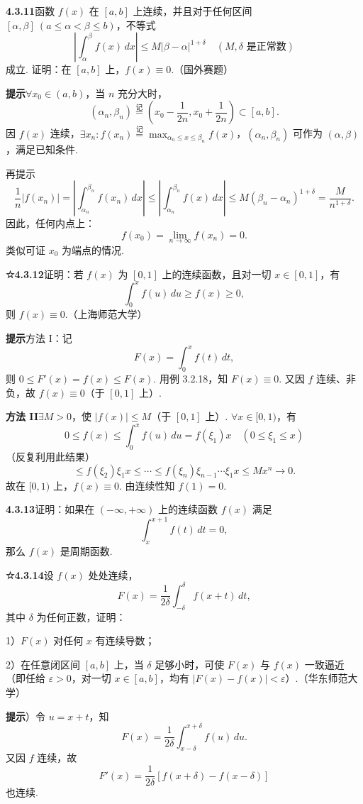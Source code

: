 \documentclass[UTF8,12pt,a4paper,fontset=fandol]{ctexart}
\begin{document}
\noindent\textbf{4.3.11}\quad 函数 $f(x)$ 在 $[a,b]$ 上连续，并且对于任何区间 $[\alpha,\beta]\ (a\le\alpha<\beta\le b)$，不等式
\[
\left|\int_\alpha^\beta f(x)\,dx\right|
\le M|\beta-\alpha|^{1+\delta}\quad(M,\delta\text{ 是正常数})
\]
成立. 证明：在 $[a,b]$ 上，$f(x)\equiv0$.（国外赛题）

\noindent\textbf{提示}\quad $\forall x_0\in(a,b)$，当 $n$ 充分大时，
\[
(\alpha_n,\beta_n)\stackrel{\text{记}}{=}\left(x_0-\frac1{2n},x_0+\frac1{2n}\right)\subset[a,b].
\]
因 $f(x)$ 连续，$\exists x_n:f(x_n)\stackrel{\text{记}}{=}\max_{\alpha_n\le x\le\beta_n}f(x)$，$(\alpha_n,\beta_n)$ 可作为 $(\alpha,\beta)$，满足已知条件.

再提示
\[
\frac1n|f(x_n)|
=\left|\int_{\alpha_n}^{\beta_n}f(x_n)\,dx\right|
\le\left|\int_{\alpha_n}^{\beta_n}f(x)\,dx\right|
\le M(\beta_n-\alpha_n)^{1+\delta}=\frac{M}{n^{1+\delta}}.
\]
因此，任何内点上：
\[
f(x_0)=\lim_{n\to\infty}f(x_n)=0.
\]
类似可证 $x_0$ 为端点的情况.

\noindent\textbf{☆4.3.12}\quad 证明：若 $f(x)$ 为 $[0,1]$ 上的连续函数，且对一切 $x\in[0,1]$，有
\[
\int_0^x f(u)\,du\ge f(x)\ge0,
\]
则 $f(x)\equiv0$.（上海师范大学）

\noindent\textbf{提示}\quad 方法 I：记
\[
F(x)=\int_0^x f(t)\,dt,
\]
则 $0\le F'(x)=f(x)\le F(x)$. 用例 3.2.18，知 $F(x)\equiv0$. 又因 $f$ 连续、非负，故 $f(x)\equiv0$（于 $[0,1]$ 上）.

\noindent\textbf{方法 II}\quad $\exists M>0$，使 $|f(x)|\le M$（于 $[0,1]$ 上）. $\forall x\in[0,1)$，有
\[
0\le f(x)\le\int_0^x f(u)\,du=f(\xi_1)x\quad(0\le\xi_1\le x)
\]
（反复利用此结果）
\[
\le f(\xi_2)\xi_1x\le\cdots\le f(\xi_n)\xi_{n-1}\cdots\xi_1x\le Mx^n\to0.
\]
故在 $[0,1)$ 上，$f(x)\equiv0$. 由连续性知 $f(1)=0$.

\noindent\textbf{4.3.13}\quad 证明：如果在 $(-\infty,+\infty)$ 上的连续函数 $f(x)$ 满足
\[
\int_x^{x+1}f(t)\,dt=0,
\]
那么 $f(x)$ 是周期函数.

\noindent\textbf{☆4.3.14}\quad 设 $f(x)$ 处处连续，
\[
F(x)=\frac1{2\delta}\int_{-\delta}^{\delta}f(x+t)\,dt,
\]
其中 $\delta$ 为任何正数，证明：

1）$F(x)$ 对任何 $x$ 有连续导数；

2）在任意闭区间 $[a,b]$ 上，当 $\delta$ 足够小时，可使 $F(x)$ 与 $f(x)$ 一致逼近（即任给 $\varepsilon>0$，对一切 $x\in[a,b]$，均有 $|F(x)-f(x)|<\varepsilon$）.（华东师范大学）

\noindent\textbf{提示}）令 $u=x+t$，知
\[
F(x)=\frac1{2\delta}\int_{x-\delta}^{x+\delta}f(u)\,du.
\]
又因 $f$ 连续，故
\[
F'(x)=\frac1{2\delta}[f(x+\delta)-f(x-\delta)]
\]
也连续.
\end{document}
